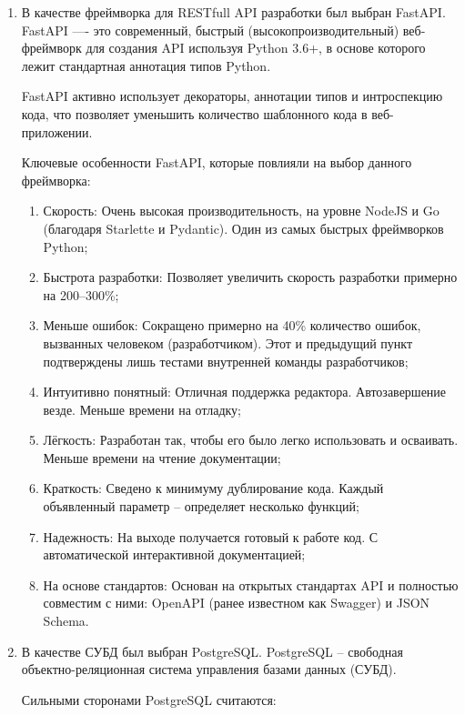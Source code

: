 \documentclass{altsu-report}
\begin{document}
\begin{enumerate}
    \item В качестве фреймворка для RESTfull API разработки был выбран FastAPI. FastAPI —- это современный, быстрый (высокопроизводительный) веб-фреймворк для создания API используя Python 3.6+, в основе которого лежит стандартная аннотация типов Python.
    
    FastAPI активно использует декораторы, аннотации типов и интроспекцию кода, что позволяет уменьшить количество шаблонного кода в веб-приложении.

    Ключевые особенности FastAPI, которые повлияли на выбор данного фреймворка:
    
    \begin{enumerate}
        \item Скорость: Очень высокая производительность, на уровне NodeJS и Go (благодаря Starlette и Pydantic). Один из самых быстрых фреймворков Python;
        \item Быстрота разработки: Позволяет увеличить скорость разработки примерно на 200–300\%;
        \item Меньше ошибок: Сокращено примерно на 40\% количество ошибок, вызванных человеком (разработчиком). Этот и предыдущий пункт подтверждены лишь тестами внутренней команды разработчиков;
        \item Интуитивно понятный: Отличная поддержка редактора. Автозавершение везде. Меньше времени на отладку;
        \item Лёгкость: Разработан так, чтобы его было легко использовать и осваивать. Меньше времени на чтение документации;
        \item Краткость: Сведено к минимуму дублирование кода. Каждый объявленный параметр -- определяет несколько функций;
        \item Надежность: На выходе получается готовый к работе код. С автоматической интерактивной документацией;
        \item На основе стандартов: Основан на открытых стандартах API и полностью совместим с ними: OpenAPI (ранее известном как Swagger) и JSON Schema.
    \end{enumerate}

    \item В качестве СУБД был выбран PostgreSQL. PostgreSQL -- свободная объектно-реляционная система управления базами данных (СУБД).

    Сильными сторонами PostgreSQL считаются:
    

\end{enumerate}
\end{document}
